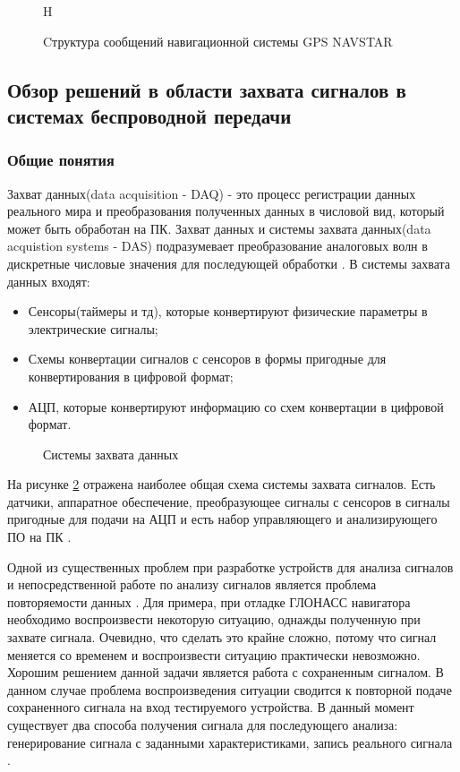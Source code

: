 \begin{figure}{H}
\begin{center}
\end{center}
\caption{Cтруктура сообщений навигационной системы GPS NAVSTAR}
\label{pic:gps_data_format}
\end{figure}

\subsection{Обзор решений в области захвата сигналов в системах беспроводной передачи}
\label{razdel12}
\subsubsection{Общие понятия}
Захват данных(data acquisition - DAQ) - это процесс регистрации данных реального мира и преобразования полученных данных в 
числовой вид, который может быть обработан на ПК. Захват данных и системы захвата данных(data acquistion systems - DAS) подразумевает
преобразование аналоговых волн в дискретные числовые значения для последующей обработки \cite{ni_acq}. В системы захвата данных входят:

\begin{itemize}
\item Сенсоры(таймеры и тд), которые конвертируют физические параметры в электрические сигналы;
\item Схемы конвертации сигналов с сенсоров в формы пригодные для конвертирования в цифровой формат;
\item АЦП, которые конвертируют информацию со схем конвертации в цифровой формат.
\end{itemize}

\begin{figure}[H]
\caption{Системы захвата данных}
\label{pic_acq}
\end{figure}

На рисунке \ref{pic_acq} отражена наиболее общая схема системы захвата сигналов. Есть датчики, аппаратное обеспечение,
преобразующее сигналы с сенсоров в сигналы пригодные для подачи на АЦП и есть набор управляющего и анализирующего ПО
на ПК \cite{ni_acq}.

Одной из существенных проблем при разработке устройств для анализа сигналов и непосредственной работе по анализу сигналов
является проблема повторяемости данных \cite{ni_article}. Для примера, при отладке ГЛОНАСС навигатора необходимо 
воспроизвести некоторую ситуацию, однажды полученную при захвате сигнала. Очевидно, что сделать это крайне сложно, потому
что сигнал меняется со временем и воспроизвести ситуацию практически невозможно. Хорошим решением данной задачи является
работа с сохраненным сигналом. В данном случае проблема воспроизведения ситуации сводится к повторной подаче сохраненного
сигнала на вход тестируемого устройства. В данный момент существует два способа получения сигнала для последующего анализа:
генерирование сигнала с заданными характеристиками, запись реального сигнала \cite{ni_article}.


